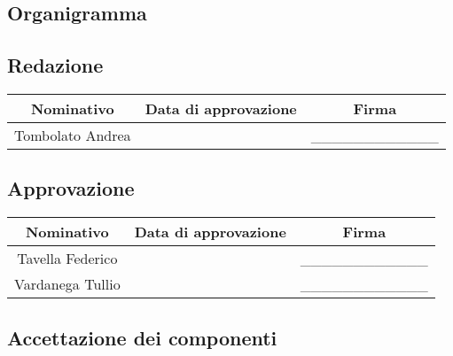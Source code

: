\documentclass[../PianoProgetto.tex]{subfiles}
\begin{document}
\begin{appendices}
\section{Organigramma}
	\subsection{Redazione}
		\begin{table}[h]
	
		\begin{tabularx}{\textwidth}{C C C}
			\toprule
			\textbf{Nominativo} & \textbf{Data di approvazione} & \textbf{Firma} \\
			\midrule
			Tombolato Andrea &  & \_\_\_\_\_\_\_\_\_\_\_\_ \\
			\bottomrule
		\end{tabularx}
		
	\end{table}
	

	
	\subsection{Approvazione}
	
		\begin{table}[h]

	
		\begin{tabularx}{\textwidth}{C C C}
			\toprule
			\textbf{Nominativo} & \textbf{Data di approvazione} & \textbf{Firma} \\
			\midrule
			Tavella Federico &  & \_\_\_\_\_\_\_\_\_\_\_\_ \\
			Vardanega Tullio &  & \_\_\_\_\_\_\_\_\_\_\_\_ \\
			\bottomrule
		\end{tabularx}
		
	\end{table}		
	
	\subsection{Accettazione dei componenti}
	
		\begin{table}[h]
	

\end{table}
\end{appendices}
\end{document}
